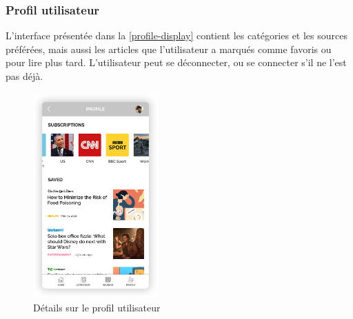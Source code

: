 \subsubsection{Profil utilisateur}
L'interface présentée dans la \autoref{profile-display} contient les catégories et les sources préférées, mais aussi les articles que l'utilisateur a marqués comme favoris ou pour lire plus tard. L'utilisateur peut se déconnecter, ou se connecter s'il ne l'est pas déjà.
\begin{figure}[H]
    \centering
    \includegraphics[width=136pt]{img/chapter4/feedny/en-profile.png}
    \caption{Détails sur le profil utilisateur}
    \label{profile-display}
\end{figure}

